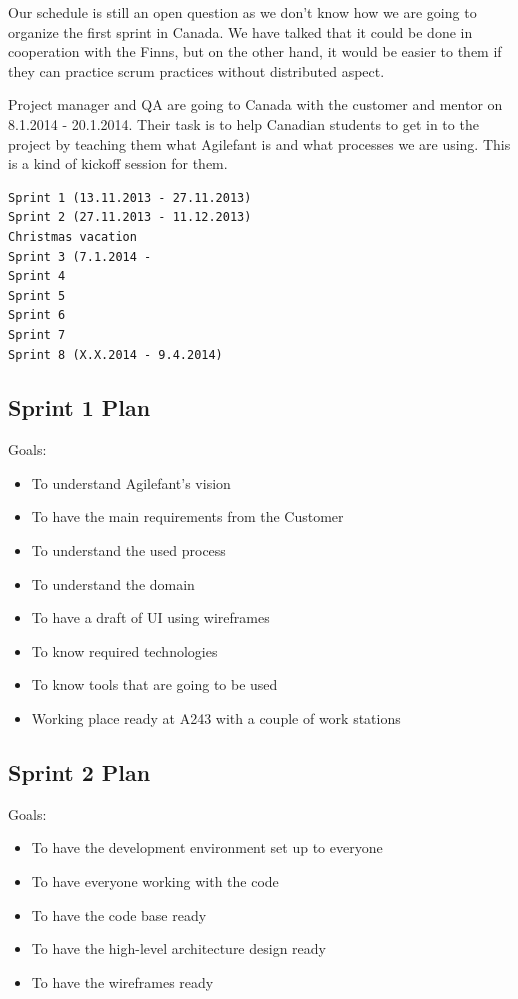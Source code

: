 Our schedule is still an open question as we don't know how we are going to organize the first sprint in Canada. We have talked that it could be done in cooperation with the Finns, but on the other hand, it would be easier to them if they can practice scrum practices without distributed aspect.

Project manager and QA are going to Canada with the customer and mentor on 8.1.2014 - 20.1.2014. Their task is to help Canadian students to get in to the project by teaching them what Agilefant is and what processes we are using. This is a kind of kickoff session for them.

\begin{verbatim}
Sprint 1 (13.11.2013 - 27.11.2013)
Sprint 2 (27.11.2013 - 11.12.2013)
Christmas vacation
Sprint 3 (7.1.2014 - 
Sprint 4
Sprint 5
Sprint 6
Sprint 7
Sprint 8 (X.X.2014 - 9.4.2014) 
\end{verbatim}

\subsection{Sprint 1 Plan}

Goals:
\begin{itemize}
\item To understand Agilefant's vision
\item To have the main requirements from the Customer
\item To understand the used process
\item To understand the domain
\item To have a draft of UI using wireframes
\item To know required technologies
\item To know tools that are going to be used
\item Working place ready at A243 with a couple of work stations
\end{itemize}

\subsection{Sprint 2 Plan}

Goals:
\begin{itemize}
\item To have the development environment set up to everyone
\item To have everyone working with the code 
\item To have the code base ready 
\item To have the high-level architecture design ready
\item To have the wireframes ready
\end{itemize}

